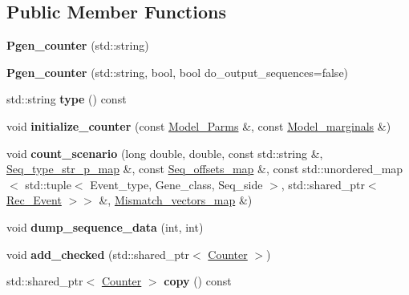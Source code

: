 \subsection*{Public Member Functions}
\begin{DoxyCompactItemize}
\item 
\mbox{\label{classPgen__counter_a0c26a5a933018df8c7ceb94213004798}} 
{\bfseries Pgen\+\_\+counter} (std\+::string)
\item 
\mbox{\label{classPgen__counter_a3291dde0930c68737fd791a2f1b2cc43}} 
{\bfseries Pgen\+\_\+counter} (std\+::string, bool, bool do\+\_\+output\+\_\+sequences=false)
\item 
\mbox{\label{classPgen__counter_a6bc278117c83c8f797578c8b448f77cf}} 
std\+::string {\bfseries type} () const
\item 
\mbox{\label{classPgen__counter_a31b44277309564af777f79954438c8f1}} 
void {\bfseries initialize\+\_\+counter} (const \hyperlink{classModel__Parms}{Model\+\_\+\+Parms} \&, const \hyperlink{classModel__marginals}{Model\+\_\+marginals} \&)
\item 
\mbox{\label{classPgen__counter_a903fd5aed510d1f467ccda5fcf173a9a}} 
void {\bfseries count\+\_\+scenario} (long double, double, const std\+::string \&, \hyperlink{classEnum__fast__memory__map}{Seq\+\_\+type\+\_\+str\+\_\+p\+\_\+map} \&, const \hyperlink{classEnum__fast__memory__dual__key__map}{Seq\+\_\+offsets\+\_\+map} \&, const std\+::unordered\+\_\+map$<$ std\+::tuple$<$ Event\+\_\+type, Gene\+\_\+class, Seq\+\_\+side $>$, std\+::shared\+\_\+ptr$<$ \hyperlink{classRec__Event}{Rec\+\_\+\+Event} $>$$>$ \&, \hyperlink{classEnum__fast__memory__map}{Mismatch\+\_\+vectors\+\_\+map} \&)
\item 
\mbox{\label{classPgen__counter_a1884670498536b560eb019cb1514eba3}} 
void {\bfseries dump\+\_\+sequence\+\_\+data} (int, int)
\item 
\mbox{\label{classPgen__counter_ade768bb6a0f87b139d7b5ae817ccb86d}} 
void {\bfseries add\+\_\+checked} (std\+::shared\+\_\+ptr$<$ \hyperlink{classCounter}{Counter} $>$)
\item 
\mbox{\label{classPgen__counter_a2a2646dc8be803621c881038c8c34e11}} 
std\+::shared\+\_\+ptr$<$ \hyperlink{classCounter}{Counter} $>$ {\bfseries copy} () const
\end{DoxyCompactItemize}
